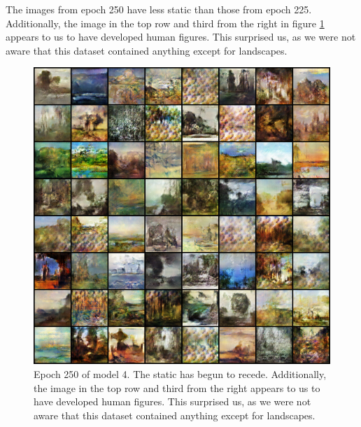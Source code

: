 \documentclass[11pt,letterpaper]{article}
\begin{document}
				The images from epoch 250 have less static than those from epoch 225.
				Additionally, the image in the top row and third from the right in figure \ref{fig:wa64:epoch250generator} appears to us to have developed human figures.
				This surprised us, as we were not aware that this dataset contained anything except for landscapes.
				\begin{figure}
					\centering
					\includegraphics[width=1.0\linewidth]{results/model4/epoch250_generator}
					\caption{Epoch 250 of model 4. The static has begun to recede. Additionally, the image in the top row and third from the right appears to us to have developed human figures. This surprised us, as we were not aware that this dataset contained anything except for landscapes.}
					\label{fig:wa64:epoch250generator}
				\end{figure}
\end{document}
